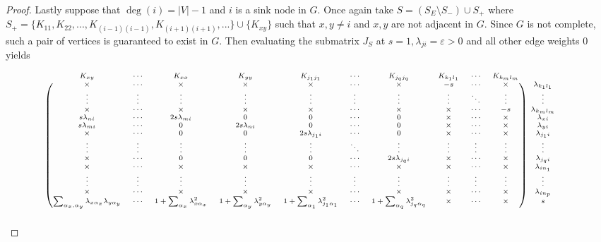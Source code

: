 \documentclass[12pt,reqno]{amsart}
\theoremstyle{plain}
\theoremstyle{definition}
\begin{document}
\begin{proof}
Lastly suppose that $\deg(i)=|V|-1$ and $i$ is a sink node in $G$. Once again take $S = (S_E \setminus S_-)\cup S_+$ where $S_+ = \{K_{11},K_{22},...,K_{(i-1)(i-1)},K_{(i+1)(i+1)},...\} \cup \{K_{x y}\}$ such that $x, y \neq i$ and $x, y$ are not adjacent in $G$. Since $G$ is not complete, such a pair of vertices is guaranteed to exist in $G$. 
Then evaluating the submatrix $J_S$  at $s=1, \lambda_{ji}=\varepsilon>0$ and all other edge weights $0$ yields

\begin{align*}
&
\begin{scriptsize}
\begin{blockarray}{ccccccccccc}
K_{xy} &\cdots & K_{xx} & K_{yy} & K_{j_{1}j_{1}} & \cdots & K_{j_{q}j_{q}} & K_{k_{1}l_{1}} & \cdots & K_{k_{m}l_{m}}\\
\begin{block}{(cccccccccc)c}
  \times & \cdots & \times & \times & \times & \cdots & \times & -s &\cdots & \times & \lambda_{k_1 l_1}\\
  \vdots & \vdots & \vdots & \vdots & \vdots & \vdots & \vdots & \vdots &\ddots &\vdots & \vdots\\
  \times & \cdots & \times & \times & \times & \cdots & \times &\times & \cdots &-s & \lambda_{k_m l_m} \\
  s \lambda_{ni} & \cdots & 2s\lambda_{mi} & 0 & 0 & \cdots & 0 & \times & \cdots &\times & \lambda_{x i}\\
  s\lambda_{mi} & \cdots & 0 & 2s\lambda_{ni} & 0 & \cdots & 0 & \times & \cdots &\times & \lambda_{y i} \\
  \times & \cdots & 0 & 0 & 2s\lambda_{j_{1}i} & \cdots & 0 & \times & \cdots &\times & \lambda_{j_1 i}\\
  \vdots & \vdots & \vdots & \vdots & \vdots & \ddots & \vdots & \vdots & \vdots & \vdots & \vdots\\
  \times & \cdots & 0 & 0 & 0 & \cdots & 2s\lambda_{j_{q}i} & \times &\cdots &\times & \lambda_{j_q i}\\
  \times & \cdots & \times & \times & \times & \cdots & \times &\times & \cdots & \times & \lambda_{i n_1}\\
  \vdots & \vdots & \vdots & \vdots & \vdots & \vdots & \vdots &\vdots & \vdots & \vdots & \vdots \\
  \times & \cdots & \times & \times & \times & \cdots & \times &\times & \cdots & \times & \lambda_{i n_p}\\
  \sum_{\alpha_x,\alpha_y}\lambda_{x \alpha_{x}}\lambda_{y \alpha_y} & \cdots & 1+\sum_{\alpha_x}\lambda_{x \alpha_{x}}^2 & 1+\sum_{\alpha_y}\lambda_{y \alpha_{y}}^2 & 1+\sum_{\alpha_1}\lambda_{j_{1}\alpha_{1}}^2 & \cdots & 1+\sum_{\alpha_q}\lambda_{j_{q}\alpha_{q}}^2 & \times &\cdots & \times & s\\

\end{block}
\end{blockarray}
\end{scriptsize}
\end{align*}
\end{proof}
\end{document}
